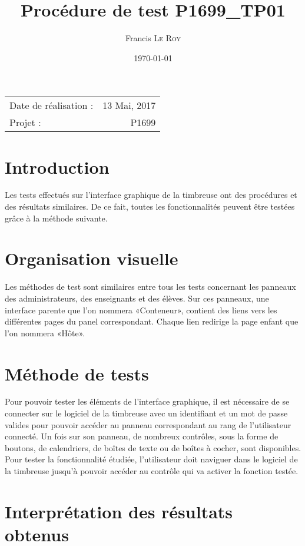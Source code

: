 \documentclass[10pt,a4paper,onecolumn]{article}
\title{Procédure de test P1699\_TP01}
\author{Francis \textsc{Le Roy}}
\date{\today}
\begin{document}
\maketitle
\thispagestyle{fancy}

\begin{center}
\begin{tabular}{l r}
Date de réalisation : & 13 Mai, 2017 \\
Projet : & P1699
\end{tabular}
\end{center}

\section{Introduction}
Les tests effectués sur l'interface graphique de la timbreuse ont des procédures et des résultats similaires. De ce fait, toutes les fonctionnalités peuvent être testées grâce à la méthode suivante.
\section{Organisation visuelle}
Les méthodes de test sont similaires entre tous les tests concernant les panneaux des administrateurs, des enseignants et des élèves. Sur ces panneaux, une interface parente que l'on nommera «Conteneur», contient des liens vers les différentes pages du panel correspondant. 
Chaque lien redirige la page enfant que l'on nommera «Hôte».\\

\section{Méthode de tests}
Pour pouvoir tester les éléments de l'interface graphique, il est nécessaire de se connecter sur le logiciel de la timbreuse avec un identifiant et un mot de passe valides pour pouvoir accéder au panneau correspondant au rang de l'utilisateur connecté. Un fois sur son panneau, de nombreux contrôles, sous la forme de boutons, de calendriers, de boîtes de texte ou de boîtes à cocher, sont disponibles. \\
Pour tester la fonctionnalité étudiée, l'utilisateur doit naviguer dans le logiciel de la timbreuse jusqu'à pouvoir accéder au contrôle qui va activer la fonction testée.

\section{Interprétation des résultats obtenus}
\end{document}
